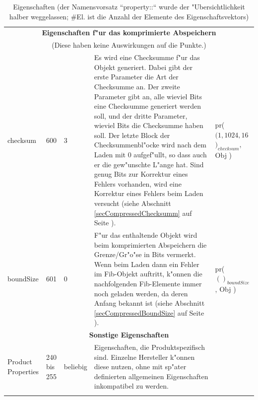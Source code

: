 \begin{small}
\begin{center}
\begin{longtable}{|p{22mm}|p{6mm}|p{5mm}|p{50mm}|p{30mm}|}
	\multicolumn{5}{|c|}{\textbf{Eigenschaften f"ur das komprimierte Abspeichern}}\\
	\multicolumn{5}{|c|}{(Diese haben keine Auswirkungen auf die Punkte.)}\\\hline
	checksum & 600 & 3 & Es wird eine Checksumme f"ur das Objekt generiert. Dabei gibt der erste Parameter die Art der Checksumme an. Der zweite Parameter gibt an, alle wieviel Bits eine Check\-summe generiert werden soll, und der dritte Parameter, wieviel Bits die Checksumme haben soll. Der letzte Block der Checksummenbl"ocke wird nach dem Laden mit 0 aufgef"ullt, so dass auch er die gew"unschte L"ange hat. Sind genug Bits zur Korrektur eines Fehlers vorhanden, wird eine Korrektur eines Fehlers beim Laden versucht (siehe Abschnitt \ref{secCompressedChecksumm} auf Seite \pageref{secCompressedChecksumm}). & pr( $( 1, 1024, 16$ $)_{checksum}$, Obj )\\\hline
	boundSize & 601 & 0 & F"ur das enthaltende Objekt wird beim komprimierten Abspeichern die Grenze/Gr"o"se in Bits vermerkt. Wenn beim Laden dann ein Fehler im Fib-Objekt auftritt, k"onnen die nachfolgenden Fib-Elemente immer noch geladen werden, da deren Anfang bekannt ist (siehe Abschnitt \ref{secCompressedBoundSize} auf Seite \pageref{secCompressedBoundSize}). & pr( $()_{boundSize}$, Obj )\\\hline

	\multicolumn{5}{|c|}{\textbf{Sonstige Eigenschaften}}\\\hline
	Product Properties & 240 bis 255 & be\-lie\-big & Eigenschaften, die Produktspezifisch sind. Einzelne Hersteller k"onnen diese nutzen, ohne mit sp"ater definierten allgemeinen Eigenschaften inkompatibel zu werden. & \\\hline

\caption{Eigenschaften (der Namensvorsatz ``property::`` wurde der "Ubersichtlichkeit halber weggelassen; \#El. ist die Anzahl der Elemente des Eigenschaftsvektors)}
\label{tablePropertyNamen}
\end{longtable}
\end{center}
\end{small}




